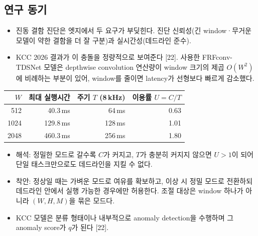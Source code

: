 \documentclass[10pt]{article}
\begin{document}
\subsection{연구 동기}
\begin{itemize}
\item 진동 결함 진단은 엣지에서 두 요구가 부딪힌다. 진단 신뢰성(긴 window·무거운 모델이 약한 결함을 더 잘 구분)과 실시간성(데드라인 준수).
\item KCC 2026 결과가 이 충돌을 정량적으로 보여준다 [22]. 사용한 FRFconv-TDSNet 모델은 depthwise convolution 연산량이 window 크기의 제곱 $O(W^2)$에 비례하는 부분이 있어, window를 줄이면 latency가 선형보다 빠르게 감소했다.
\end{itemize}
\begin{center}\footnotesize
\begin{tabular}{@{}rrrr@{}}
\toprule
$W$ & 최대 실행시간 & 주기 $T$ (8\,kHz) & 이용률 $U=C/T$ \\ \midrule
512 & 40.3\,ms & 64\,ms & 0.63 \\
1024 & 129.8\,ms & 128\,ms & 1.01 \\
2048 & 460.3\,ms & 256\,ms & 1.80 \\
\bottomrule
\end{tabular}
\end{center}
\begin{itemize}
\item 해석: 정밀한 모드로 갈수록 $C$가 커지고, $T$가 충분히 커지지 않으면 $U>1$이 되어 단일 태스크만으로도 데드라인을 지킬 수 없다.
\item 착안: 정상일 때는 가벼운 모드로 여유를 확보하고, 이상 시 정밀 모드로 전환하되 데드라인 안에서 실행 가능한 경우에만 허용한다. 조절 대상은 window 하나가 아니라 $(W,H,M)$을 묶은 모드다.
\item KCC 모델은 분류 형태이나 내부적으로 anomaly detection을 수행하며 그 anomaly score가 $q$가 된다 [22].
\end{itemize}
\end{document}
